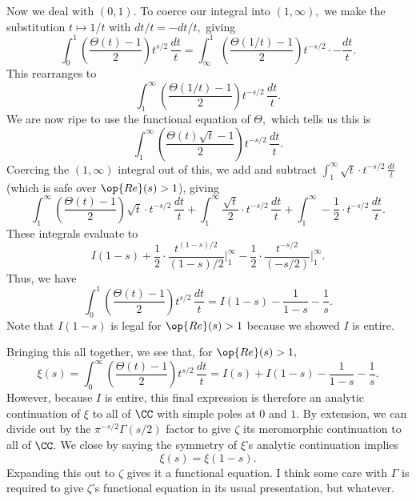 Now we deal with $(0,1).$ To coerce our integral into $(1,\infty),$ we make the substitution $t\mapsto1/t$ with $dt/t=-dt/t,$ giving
\[\int_0^1\left(\frac{\Theta(t)-1}2\right)t^{s/2}\,\frac{dt}t=\int_\infty^1\left(\frac{\Theta(1/t)-1}2\right)t^{-s/2}\cdot-\frac{dt}t.\]
This rearranges to
\[\int_1^\infty\left(\frac{\Theta(1/t)-1}2\right)t^{-s/2}\,\frac{dt}t.\]
We are now ripe to use the functional equation of $\Theta,$ which tells us this is
\[\int_1^\infty\left(\frac{\Theta(t)\sqrt t-1}2\right)t^{-s/2}\,\frac{dt}t.\]
Coercing the $(1,\infty)$ integral out of this, we add and subtract $\int_1^\infty\sqrt t\cdot t^{-s/2}\,\frac{dt}t$ (which is safe over $\op{Re}(s)>1$), giving
\[\int_1^\infty\left(\frac{\Theta(t)-1}2\right)\sqrt t\cdot t^{-s/2}\,\frac{dt}t+\int_1^\infty\frac{\sqrt t}2\cdot t^{-s/2}\,\frac{dt}t+\int_1^\infty-\frac12\cdot t^{-s/2}\,\frac{dt}t.\]
These integrals evaluate to
\[I(1-s)+\frac12\cdot\frac{t^{(1-s)/2}}{(1-s)/2}\bigg|_1^\infty-\frac12\cdot\frac{t^{-s/2}}{(-s/2)}\bigg|_1^\infty.\]
Thus, we have
\[\int_0^1\left(\frac{\Theta(t)-1}2\right)t^{s/2}\,\frac{dt}t=I(1-s)-\frac1{1-s}-\frac1s.\]
Note that $I(1-s)$ is legal for $\op{Re}(s)>1$ because we showed $I$ is entire.

Bringing this all together, we see that, for $\op{Re}(s)>1,$
\[\xi(s)=\int_0^\infty\left(\frac{\Theta(t)-1}2\right)t^{s/2}\,\frac{dt}t=I(s)+I(1-s)-\frac1{1-s}-\frac1s.\]
However, because $I$ is entire, this final expression is therefore an analytic continuation of $\xi$ to all of $\CC$ with simple poles at $0$ and $1.$ By extension, we can divide out by the $\pi^{-s/2}\Gamma(s/2)$ factor to give $\zeta$ its meromorphic continuation to all of $\CC.$ We close by saying the symmetry of $\xi$'s analytic continuation implies
\[\xi(s)=\xi(1-s).\]
Expanding this out to $\zeta$ gives it a functional equation. I think some care with $\Gamma$ is required to give $\zeta$'s functional equation in its usual presentation, but whatever.